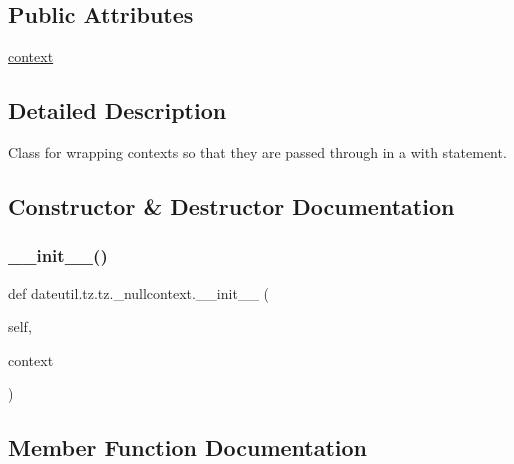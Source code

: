 \subsection*{Public Attributes}
\begin{DoxyCompactItemize}
\item 
\hyperlink{classdateutil_1_1tz_1_1tz_1_1__nullcontext_abd282f262c7156ea82af1261fbc392b7}{context}
\end{DoxyCompactItemize}


\subsection{Detailed Description}
\begin{DoxyVerb}Class for wrapping contexts so that they are passed through in a
with statement.
\end{DoxyVerb}
 

\subsection{Constructor \& Destructor Documentation}
\mbox{\label{classdateutil_1_1tz_1_1tz_1_1__nullcontext_a35756481da82fbc41b52c1693ef3012f}} 
\subsubsection{\texorpdfstring{\+\_\+\+\_\+init\+\_\+\+\_\+()}{\_\_init\_\_()}}
{\footnotesize\ttfamily def dateutil.\+tz.\+tz.\+\_\+nullcontext.\+\_\+\+\_\+init\+\_\+\+\_\+ (\begin{DoxyParamCaption}\item[{}]{self,  }\item[{}]{context }\end{DoxyParamCaption})}



\subsection{Member Function Documentation}
\mbox{\label{classdateutil_1_1tz_1_1tz_1_1__nullcontext_a90b160d70fbd928ab1608ad8ee6a7b6f}} 
